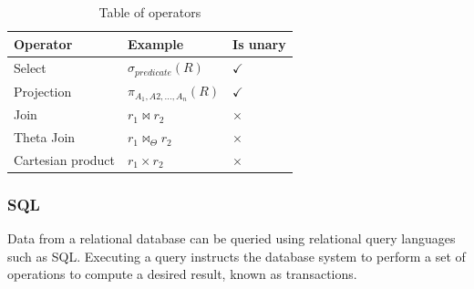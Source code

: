 \begin{table}[h]
    \centering
    \begin{tabular}{|lll|}
    \hline 
    \multicolumn{1}{|l|}{\textbf{Operator}}          & \multicolumn{1}{l|}{\textbf{Example}}   & \multicolumn{1}{l|}{\textbf{Is unary}}      \\ \hline
    \multicolumn{1}{|l|}{Select}                     & \multicolumn{1}{l|}{$\sigma_{predicate}(R)$}             & \multicolumn{1}{l|}{$\checkmark$}           \\ \hline
    \multicolumn{1}{|l|}{Projection}                 & \multicolumn{1}{l|}{$\pi_{A_1, A2,...,A_n}(R)$}             & \multicolumn{1}{l|}{$\checkmark$}           \\ \hline
    \multicolumn{1}{|l|}{Join}                       & \multicolumn{1}{l|}{$r_1 \Join r_2$}             & \multicolumn{1}{l|}{$\times$}           \\ \hline
    \multicolumn{1}{|l|}{Theta Join}                 & \multicolumn{1}{l|}{$r_1 \Join_\Theta r_2$}             & \multicolumn{1}{l|}{$\times$}           \\ \hline
    \multicolumn{1}{|l|}{Cartesian product}          & \multicolumn{1}{l|}{$r_1\times r_2$}              & \multicolumn{1}{l|}{$\times$}            \\ \hline
    \end{tabular}
    \caption{Table of operators}
    \label{Relational algebra operators}
\end{table}



\subsubsection{SQL}\label{sec:SQL}

Data from a relational database can be queried using relational query languages such as SQL.
Executing a query instructs the database system to perform a set of operations to compute a desired result, known as transactions.
